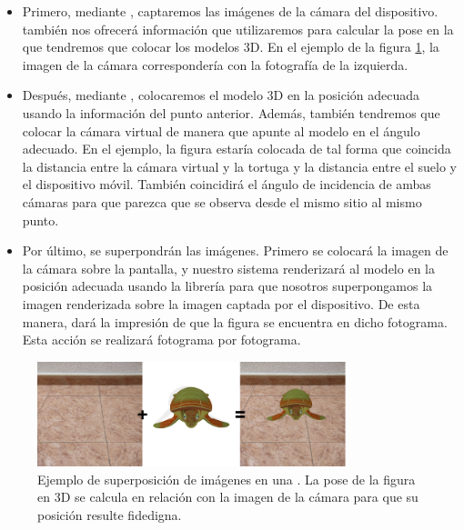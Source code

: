 \documentclass{subfiles}
\begin{document}
        \begin{itemize}
            \item Primero, mediante \webxr, captaremos las imágenes de la cámara del dispositivo. \webxr también nos ofrecerá información que utilizaremos para calcular la pose en la que tendremos que colocar los modelos 3D. En el ejemplo de la figura \ref{fig:sample_ra_schema}, la imagen de la cámara correspondería con la fotografía de la izquierda.
            \item Después, mediante \threejs, colocaremos el modelo 3D en la posición adecuada usando la información del punto anterior. Además, también tendremos que colocar la cámara virtual de manera que apunte al modelo en el ángulo adecuado. En el ejemplo, la figura estaría colocada de tal forma que coincida la distancia entre la cámara virtual y la tortuga y la distancia entre el suelo y el dispositivo móvil. También coincidirá el ángulo de incidencia de ambas cámaras para que parezca que se observa desde el mismo sitio al mismo punto.
            \item Por último, se superpondrán las imágenes. Primero se colocará la imagen de la cámara sobre la pantalla, y nuestro sistema renderizará al modelo en la posición adecuada usando la librería \threejs para que nosotros superpongamos la imagen renderizada sobre la imagen captada por el dispositivo. De esta manera, dará la impresión de que la figura se encuentra en dicho fotograma. Esta acción se realizará fotograma por fotograma.
        \end{itemize}

        \begin{figure}
        \centering
        \includegraphics[width=0.8\textwidth]{img/sample_ra_schema.png}
        \caption[Ejemplo de superposición de imágenes en una \ra.]{Ejemplo de superposición de imágenes en una \ra. La pose de la figura en 3D se calcula en relación con la imagen de la cámara para que su posición resulte fidedigna.}
        \label{fig:sample_ra_schema}
        \end{figure}
\end{document}
